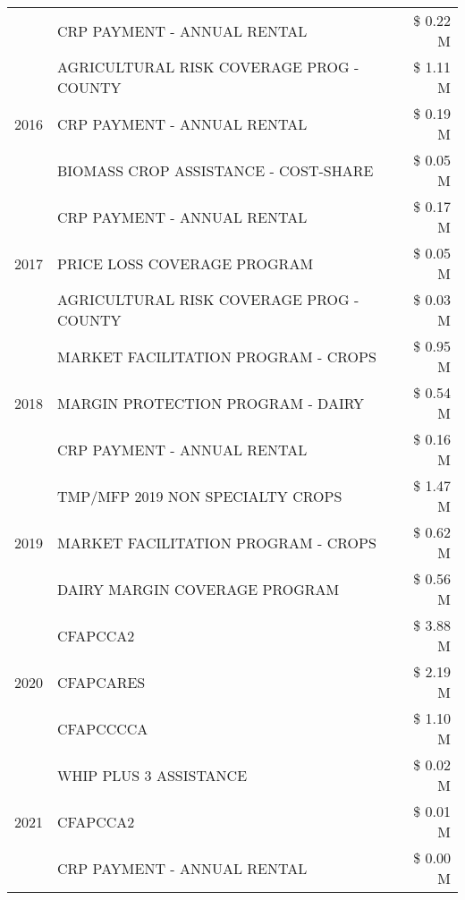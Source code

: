 \begin{tabular}{llr}
 & CRP PAYMENT - ANNUAL RENTAL & \$ 0.22 M \\
\cline{1-3}
\multirow[t]{3}{*}{2016} & AGRICULTURAL RISK COVERAGE PROG - COUNTY & \$ 1.11 M \\
 & CRP PAYMENT - ANNUAL RENTAL & \$ 0.19 M \\
 & BIOMASS CROP ASSISTANCE - COST-SHARE & \$ 0.05 M \\
\cline{1-3}
\multirow[t]{3}{*}{2017} & CRP PAYMENT - ANNUAL RENTAL & \$ 0.17 M \\
 & PRICE LOSS COVERAGE PROGRAM & \$ 0.05 M \\
 & AGRICULTURAL RISK COVERAGE PROG - COUNTY & \$ 0.03 M \\
\cline{1-3}
\multirow[t]{3}{*}{2018} & MARKET FACILITATION PROGRAM - CROPS & \$ 0.95 M \\
 & MARGIN PROTECTION PROGRAM - DAIRY & \$ 0.54 M \\
 & CRP PAYMENT - ANNUAL RENTAL & \$ 0.16 M \\
\cline{1-3}
\multirow[t]{3}{*}{2019} & TMP/MFP 2019 NON SPECIALTY CROPS & \$ 1.47 M \\
 & MARKET FACILITATION PROGRAM - CROPS & \$ 0.62 M \\
 & DAIRY MARGIN COVERAGE PROGRAM & \$ 0.56 M \\
\cline{1-3}
\multirow[t]{3}{*}{2020} & CFAPCCA2 & \$ 3.88 M \\
 & CFAPCARES & \$ 2.19 M \\
 & CFAPCCCCA & \$ 1.10 M \\
\cline{1-3}
\multirow[t]{3}{*}{2021} & WHIP PLUS 3 ASSISTANCE & \$ 0.02 M \\
 & CFAPCCA2 & \$ 0.01 M \\
 & CRP PAYMENT - ANNUAL RENTAL & \$ 0.00 M \\
\cline{1-3}
\bottomrule
\end{tabular}
